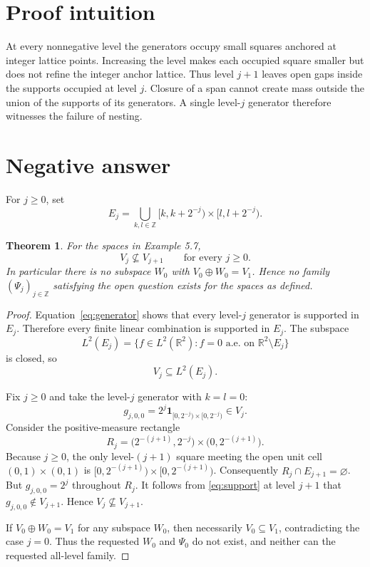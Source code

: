 \documentclass[11pt]{article}
\newtheorem{theorem}{Theorem}
\newcommand{\R}{\mathbb R}
\newcommand{\Z}{\mathbb Z}
\newcommand{\ind}{\mathbf 1}
\begin{document}
\section{Proof intuition}

At every nonnegative level the generators occupy small squares anchored at
integer lattice points.  Increasing the level makes each occupied square
smaller but does not refine the integer anchor lattice.  Thus level $j+1$
leaves open gaps inside the supports occupied at level $j$.  Closure of a span
cannot create mass outside the union of the supports of its generators.  A
single level-$j$ generator therefore witnesses the failure of nesting.

\section{Negative answer}

For $j\geq0$, set
\[
 E_j=\bigcup_{k,l\in\Z}
 [k,k+2^{-j})\times[l,l+2^{-j}).
\]

\begin{theorem}\label{thm:main}
For the spaces in Example 5.7,
\[
 V_j\not\subseteq V_{j+1}\qquad\text{for every }j\geq0.
\]
In particular there is no subspace $W_0$ with
$V_0\oplus W_0=V_1$.  Hence no family $(\Psi_j)_{j\in\Z}$ satisfying the
open question exists for the spaces as defined.
\end{theorem}

\begin{proof}
Equation~\eqref{eq:generator} shows that every level-$j$ generator is
supported in $E_j$.  Therefore every finite linear combination is supported
in $E_j$.  The subspace
\[
 L^2(E_j)=\{f\in L^2(\R^2):f=0\text{ a.e. on }\R^2\setminus E_j\}
\]
is closed, so
\begin{equation}\label{eq:support}
 V_j\subseteq L^2(E_j).
\end{equation}

Fix $j\geq0$ and take the level-$j$ generator with $k=l=0$:
\[
 g_{j,0,0}=2^j\ind_{[0,2^{-j})\times[0,2^{-j})}\in V_j.
\]
Consider the positive-measure rectangle
\[
 R_j=\bigl(2^{-(j+1)},2^{-j}\bigr)
     \times\bigl(0,2^{-(j+1)}\bigr).
\]
Because $j\geq0$, the only level-$(j+1)$ square meeting the open unit cell
$(0,1)\times(0,1)$ is
$[0,2^{-(j+1)})\times[0,2^{-(j+1)})$.  Consequently
$R_j\cap E_{j+1}=\varnothing$.  But $g_{j,0,0}=2^j$ throughout $R_j$.
It follows from \eqref{eq:support} at level $j+1$ that
$g_{j,0,0}\notin V_{j+1}$.  Hence $V_j\not\subseteq V_{j+1}$.

If $V_0\oplus W_0=V_1$ for any subspace $W_0$, then necessarily
$V_0\subseteq V_1$, contradicting the case $j=0$.  Thus the requested
$W_0$ and $\Psi_0$ do not exist, and neither can the requested all-level
family.
\end{proof}
\end{document}

